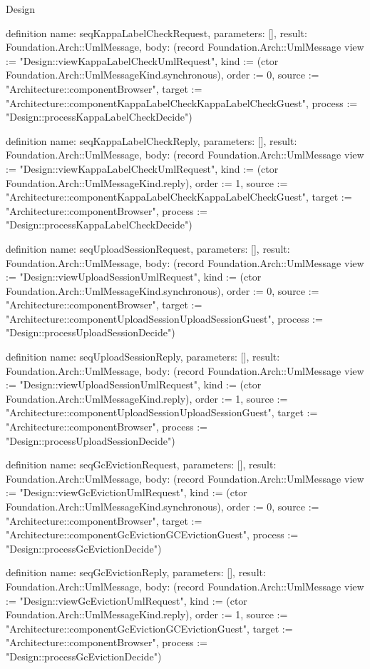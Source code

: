 \begin{lexlean}{Design}
\begin{semanticmodule}
definition{
  name: seqKappaLabelCheckRequest,
  parameters: [],
  result: Foundation.Arch::UmlMessage,
  body: (record Foundation.Arch::UmlMessage {view := "Design::viewKappaLabelCheckUmlRequest", kind := (ctor Foundation.Arch::UmlMessageKind.synchronous), order := 0, source := "Architecture::componentBrowser", target := "Architecture::componentKappaLabelCheckKappaLabelCheckGuest", process := "Design::processKappaLabelCheckDecide"})
}

definition{
  name: seqKappaLabelCheckReply,
  parameters: [],
  result: Foundation.Arch::UmlMessage,
  body: (record Foundation.Arch::UmlMessage {view := "Design::viewKappaLabelCheckUmlRequest", kind := (ctor Foundation.Arch::UmlMessageKind.reply), order := 1, source := "Architecture::componentKappaLabelCheckKappaLabelCheckGuest", target := "Architecture::componentBrowser", process := "Design::processKappaLabelCheckDecide"})
}

definition{
  name: seqUploadSessionRequest,
  parameters: [],
  result: Foundation.Arch::UmlMessage,
  body: (record Foundation.Arch::UmlMessage {view := "Design::viewUploadSessionUmlRequest", kind := (ctor Foundation.Arch::UmlMessageKind.synchronous), order := 0, source := "Architecture::componentBrowser", target := "Architecture::componentUploadSessionUploadSessionGuest", process := "Design::processUploadSessionDecide"})
}

definition{
  name: seqUploadSessionReply,
  parameters: [],
  result: Foundation.Arch::UmlMessage,
  body: (record Foundation.Arch::UmlMessage {view := "Design::viewUploadSessionUmlRequest", kind := (ctor Foundation.Arch::UmlMessageKind.reply), order := 1, source := "Architecture::componentUploadSessionUploadSessionGuest", target := "Architecture::componentBrowser", process := "Design::processUploadSessionDecide"})
}

definition{
  name: seqGcEvictionRequest,
  parameters: [],
  result: Foundation.Arch::UmlMessage,
  body: (record Foundation.Arch::UmlMessage {view := "Design::viewGcEvictionUmlRequest", kind := (ctor Foundation.Arch::UmlMessageKind.synchronous), order := 0, source := "Architecture::componentBrowser", target := "Architecture::componentGcEvictionGCEvictionGuest", process := "Design::processGcEvictionDecide"})
}

definition{
  name: seqGcEvictionReply,
  parameters: [],
  result: Foundation.Arch::UmlMessage,
  body: (record Foundation.Arch::UmlMessage {view := "Design::viewGcEvictionUmlRequest", kind := (ctor Foundation.Arch::UmlMessageKind.reply), order := 1, source := "Architecture::componentGcEvictionGCEvictionGuest", target := "Architecture::componentBrowser", process := "Design::processGcEvictionDecide"})
}


\end{semanticmodule}
\end{lexlean}
